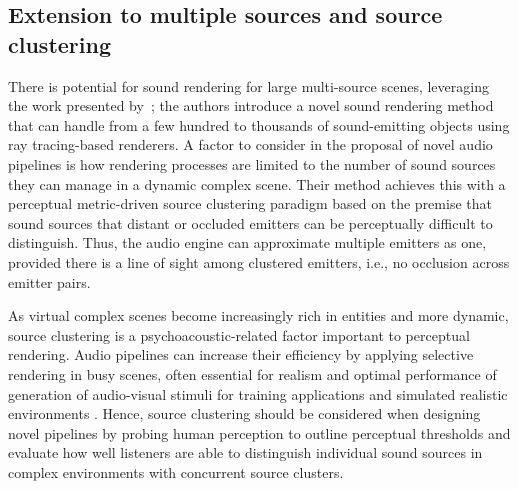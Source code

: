 \subsection{Extension to multiple sources and source clustering}
There is potential for sound rendering for large multi-source scenes, leveraging the work presented by~\cite{schissler2016interactive}; the authors introduce a novel sound rendering method that can handle from a few hundred to thousands of sound-emitting objects using ray tracing-based renderers. A factor to consider in the proposal of novel audio pipelines is how rendering processes are limited to the number of sound sources they can manage in a dynamic complex scene. Their method achieves this with a perceptual metric-driven source clustering paradigm based on the premise that sound sources that distant or occluded emitters can be perceptually difficult to distinguish. Thus, the audio engine can approximate multiple emitters as one, provided there is a line of sight among clustered emitters, i.e., no occlusion across emitter pairs.\par
As virtual complex scenes become increasingly rich in entities and more dynamic, source clustering is a psychoacoustic-related factor important to perceptual rendering. Audio pipelines can increase their efficiency by applying selective rendering in busy scenes, often essential for realism and optimal performance of generation of audio-visual stimuli for training applications and simulated realistic environments \citep{Woodward2021}. Hence, source clustering should be considered when designing novel pipelines by probing human perception to outline perceptual thresholds and evaluate how well listeners are able to distinguish individual sound sources in complex environments with concurrent source clusters.\par

